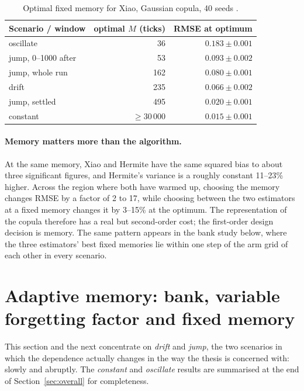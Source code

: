 \begin{table}[ht]
  \centering
  \caption{Optimal fixed memory for Xiao, Gaussian copula, 40 seeds .}
  \label{tab:sweep}
  \begin{tabular}{lrr}
    \toprule
    Scenario / window & optimal $M$ (ticks) & RMSE at optimum \\
    \midrule
    oscillate             & 36              & $0.183\pm0.001$ \\
    jump, 0--1000 after   & 53              & $0.093\pm0.002$ \\
    jump, whole run       & 162             & $0.080\pm0.001$ \\
    drift                 & 235             & $0.066\pm0.002$ \\
    jump, settled         & 495             & $0.020\pm0.001$ \\
    constant              & $\ge 30\,000$   & $0.015\pm0.001$ \\
    \bottomrule
  \end{tabular}
\end{table}

\paragraph{Memory matters more than the algorithm.} At the same memory, Xiao and Hermite have the
same squared bias to about three significant figures, and Hermite's variance is a roughly constant
11--23\% higher. Across the region where both have warmed up, choosing the memory changes RMSE by a
factor of 2 to 17, while choosing between the two estimators at a fixed memory changes it by 3--15\%
at the optimum. The representation of the copula therefore has a real but second-order cost; the
first-order design decision is memory. The same pattern appears in the bank study below, where the
three estimators' best fixed memories lie within one step of the arm grid of each other in every
scenario.

\section{Adaptive memory: bank, variable forgetting factor and fixed memory}
\label{sec:adaptive}

This section and the next concentrate on \emph{drift} and \emph{jump}, the two scenarios in which
the dependence actually changes in the way the thesis is concerned with: slowly and abruptly. The
\emph{constant} and \emph{oscillate} results are summarised at the end of
Section~\ref{sec:overall} for completeness.


